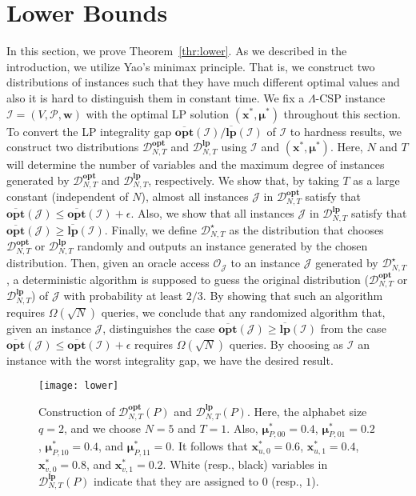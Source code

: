 \documentclass[letterpaper, 11pt]{article}
\newcommand{\calD}{\mathcal{D}}
\newcommand{\calI}{\mathcal{I}}
\newcommand{\calJ}{\mathcal{J}}
\newcommand{\calO}{\mathcal{O}}
\newcommand{\calP}{\mathcal{P}}
\newcommand{\biw}{\boldsymbol{w}}
\newcommand{\bix}{\boldsymbol{x}}
\newcommand{\bimu}{\boldsymbol{\mu}}
\newcommand{\lp}{\mathbf{lp}}
\newcommand{\opt}{\mathbf{opt}}
\newcommand{\olopt}{\overline{\mathbf{opt}}}
\newcommand{\ollp}{\overline{\mathbf{lp}}}
\begin{document}
\section{Lower Bounds}\label{sec:lower}
In this section, we prove Theorem~\ref{thr:lower}.
As we described in the introduction, we utilize Yao's minimax principle.
That is, we construct two distributions of instances such that they have much different optimal values and also it is hard to distinguish them in constant time.
We fix a $\Lambda$-CSP instance $\calI=(V,\calP,\biw)$ with the optimal LP solution $(\bix^*,\bimu^*)$ throughout this section.
To convert the LP integrality gap $\overline{\opt}(\calI)/\overline{\lp}(\calI)$ of $\calI$ to hardness results,
we construct two distributions $\calD_{N,T}^{\opt}$ and $\calD_{N,T}^{\lp}$ using $\calI$ and $(\bix^*,\bimu^*)$.
Here, $N$ and $T$ will determine the number of variables and the maximum degree of instances generated by $\calD_{N,T}^{\opt}$ and $\calD_{N,T}^{\lp}$, respectively.
We show that, by taking $T$ as a large constant (independent of $N$),
almost all instances $\calJ$ in $\calD_{N,T}^{\opt}$ satisfy that $\overline{\opt}(\calJ) \leq \overline{\opt}(\calI)+\epsilon$.
Also, we show that all instances $\calJ$ in $\calD_{N,T}^{\lp}$ satisfy that $\overline{\opt}(\calJ) \geq \overline{\lp}(\calI)$.
Finally, we define $\calD_{N,T}^\star$ as the distribution that chooses $\calD_{N,T}^{\opt}$ or $\calD_{N,T}^{\lp}$ randomly and outputs an instance generated by the chosen distribution.
Then, given an oracle access $\calO_{\calJ}$ to an instance $\calJ$ generated by $\calD_{N,T}^\star$,
a deterministic algorithm is supposed to guess the original distribution ($\calD_{N,T}^{\opt}$ or $\calD_{N,T}^{\lp}$) of $\calJ$ with probability at least $2/3$.
By showing that such an algorithm requires $\Omega(\sqrt{N})$ queries,
we conclude that any randomized algorithm that,
given an instance $\calJ$,
distinguishes the case $\olopt(\calJ) \geq \ollp(\calI)$ from the case $\olopt(\calJ) \leq \olopt(\calI)+\epsilon$
requires $\Omega(\sqrt{N})$ queries.
By choosing as $\calI$ an instance with the worst integrality gap,
we have the desired result.
\begin{figure}[t]
  \begin{center}
    \texttt{[image: lower]}
    \caption{Construction of $\calD_{N,T}^{\opt}(P)$ and $\calD_{N,T}^{\lp}(P)$.
      Here, the alphabet size $q=2$, 
      and we choose $N=5$ and $T=1$.
      Also, $\bimu^{*}_{P,00}=0.4$, $\bimu^{*}_{P,01}=0.2$, $\bimu^{*}_{P,10}=0.4$, and $\bimu^*_{P,11}=0$.
      It follows that $\bix^{*}_{u,0}=0.6$, $\bix^{*}_{u,1}=0.4$, $\bix^{*}_{v,0}=0.8$, and $\bix^*_{v,1}=0.2$.
      White (resp., black) variables in $\calD_{N,T}^{\lp}(P)$ indicate that they are assigned to $0$ (resp., $1$).
    }
    \label{fig:lower}
  \end{center}
\end{figure}
\end{document}
